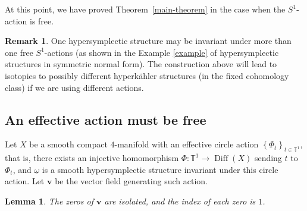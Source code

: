 \documentclass[11pt]{amsart}
\DeclareMathOperator{\Diff}{Diff}
\theoremstyle{plain}
\newtheorem{lemma}[theorem]{Lemma}
\theoremstyle{definition}
\newtheorem{remark}[theorem]{Remark}
\theoremstyle{plain}
\theoremstyle{definition}
\numberwithin{equation}{section}
\numberwithin{theorem}{section}
\begin{document}
At this point, we have proved Theorem~\ref{main-theorem} in the case when the $S^1$-action is free. 


\begin{remark}
      One hypersymplectic structure may be invariant under more than one free $S^1$-actions (as shown in the Example \ref{example} of hypersymplectic structures in symmetric normal form). The construction above will lead to isotopies to possibly different hyperk\"ahler structures (in the fixed cohomology class) if we are using different actions.
  \end{remark}

\subsection{An effective action must be free}
Let $X$ be a smooth compact $4$-manifold with an effective circle action $\left\{\Phi_t\right\}_{t\in \mathbb{T}^1}$,  that is, there exists an injective homomorphism $\Phi:\mathbb{T}^1\rightarrow\Diff\left(X\right)$ sending $t$ to $\Phi_t$, and $\underline\omega$ is a smooth hypersymplectic structure invariant under this circle action. Let $\bm v$ be the vector field generating such action.

\begin{lemma}
\label{lemma:isolated-zero}
The zeros of $\bm v$ are isolated, and the index of each zero is $1$.
\end{lemma}
\end{document}
